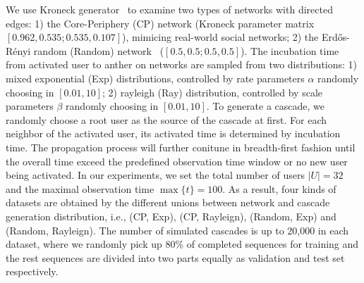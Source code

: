 We use Kroneck
generator~\cite{LeskovecICML07} to examine two types of networks with directed
edges: 1) the Core-Periphery (CP) network (Kroneck parameter matrix $[0.962,
0.535; 0.535, 0.107]$), mimicing real-world social networks; 2) the Erd\H{o}s-R{\'e}nyi random
(Random) network~\cite{Erdos60} ($[0.5, 0.5; 0.5, 0.5]$). The incubation time
from activated user to anther on networks are sampled from two distributions: 1)
mixed exponential (Exp) distributions, controlled by rate parameters $\alpha$
randomly choosing in $[0.01, 10]$; 2) rayleigh (Ray) distribution, controlled by
scale parameters $\beta$ randomly choosing in $[0.01, 10]$. To generate a
cascade, we randomly choose a root user as the source of the cascade at first.
For each neighbor of the activated user, its activated time is determined by
incubation time. The propagation process will further conitune  in
breadth-first fashion until the overall time exceed the predefined observation
time window or no new user being activated. In our experiments, we set the total
number of users $|U|=32$ and the maximal observation time $\max\{t\}=100$.
As a result, four kinds of datasets are obtained by the different unions between
network and cascade generation distribution, i.e., (CP, Exp), (CP, Rayleign),
(Random, Exp) and (Random, Rayleign). The number of simulated cascades is up to
20,000 in each dataset, where we randomly pick up 80\% of completed sequences for training and the rest sequences are
divided into two parts equally as validation and test set respectively. 

